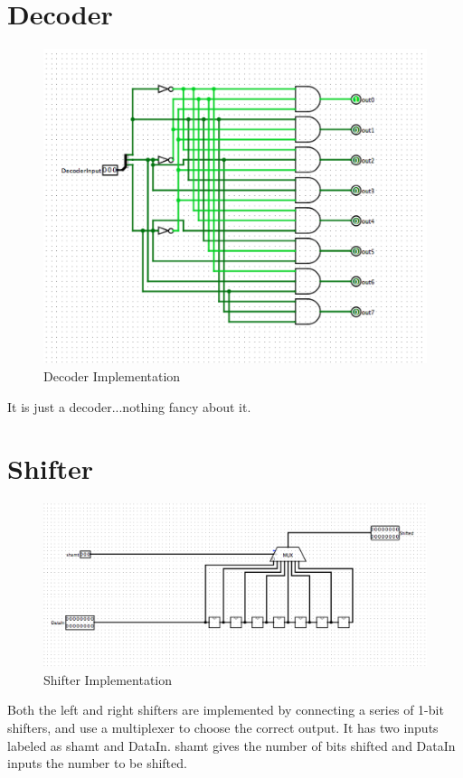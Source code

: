 \documentclass{article}
\begin{document}
	\section{Decoder}
	\begin{figure}[H]
		\begin{center}
			\includegraphics[scale=0.5]{decoder}
			\caption{Decoder Implementation}
		\end{center}
	\end{figure}
	It is just a decoder...nothing fancy about it.
	\clearpage
	\section{Shifter}
	\begin{figure}[H]
		\begin{center}
			\includegraphics[scale=0.5]{shifter}
			\caption{Shifter Implementation}
		\end{center}
	\end{figure}
	Both the left and right shifters are implemented by connecting a series of 1-bit shifters, and use a multiplexer to choose the correct output. It has two inputs labeled as shamt and DataIn. shamt gives the number of bits shifted and DataIn inputs the number to be shifted. 
	\clearpage
\end{document}
